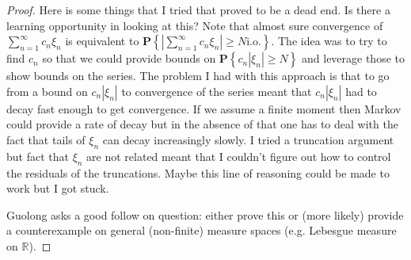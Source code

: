 \documentclass{amsbook}
\theoremstyle{definition}
\theoremstyle{remark}
\newcommand{\probability}[1]{\textbf{P}\left \{#1 \right \}}
\newcommand{\reals}{\mathbb{R}}
\newcommand{\abs}[1]{\left \vert #1 \right \vert}
\begin{document}
\begin{proof}
Here is some things that I tried that proved to be a dead end.  Is there
a learning opportunity in looking at this?  Note that almost sure
convergence of $\sum_{n=1}^\infty c_n \xi_n$ is equivalent to
$\probability{\abs{\sum_{n=1}^\infty c_n \xi_n} \geq N \text{
    i.o.}}$.  The idea was to try to find $c_n$ so that we could
provide bounds on $\probability{c_n\abs{\xi_n} \geq N}$ and leverage
those to show bounds on the series.  The problem I had with this
approach is that to go from a bound on $c_n\abs{\xi_n}$ to convergence
of the series meant that $c_n\abs{\xi_n}$ had to decay fast enough to
get convergence.  If we assume a finite moment then Markov could
provide a rate of decay but in the absence of that one has to deal
with the fact that tails of $\xi_n$ can decay increasingly slowly.
I tried a truncation argument but fact that $\xi_n$ are not related
meant that I couldn't figure out how to control the residuals of the
truncations.  Maybe this line of reasoning could be made to work but I
got stuck.

Guolong asks a good follow on question: either prove this or (more
likely) provide a
counterexample on general (non-finite) measure spaces (e.g. Lebesgue measure on $\reals$).
\end{proof}
\end{document}
